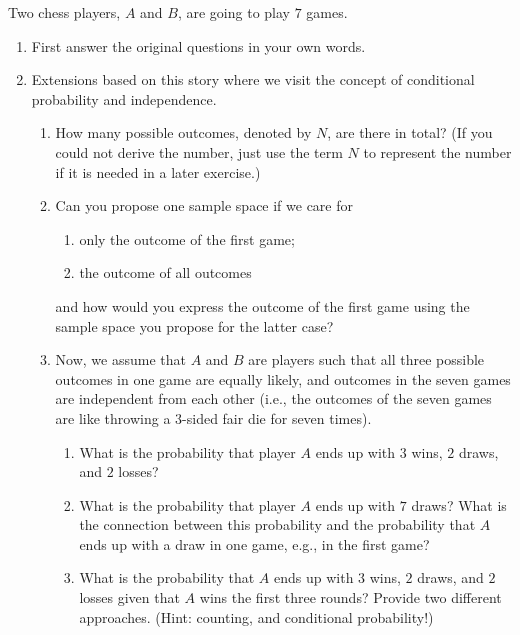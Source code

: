 
\begin{exercise}[\textbf{BH.7}]
	Two chess players, $A$ and $B$, are going to play $7$ games. 
		\begin{enumerate}
		\item First answer the original questions in your own words.
		\item Extensions based on this story where we visit the concept of conditional probability and independence.
		\begin{enumerate}
					\item How many possible outcomes, denoted by $N$, are there in total? (If you could not derive the number, just use the term $N$ to represent the number if it is needed in a later exercise.)
			\item Can you propose one sample space if we care for 
			\begin{enumerate}
				\item only the outcome of the first game;
				\item the outcome of all outcomes
			\end{enumerate}
			and how would you express the outcome of the first game using the sample space you propose for the latter case?
			\item Now, we assume that $A$ and $B$ are players such that all three possible outcomes in one game are equally likely, and outcomes in the seven games are independent from each other (i.e., the outcomes of the seven games are like throwing a $3$-sided fair die for seven times). 
			\begin{enumerate}
				\item What is the probability that player $A$ ends up with $3$ wins, $2$ draws, and $2$ losses?
				\item What is the probability that player $A$ ends up with $7$ draws? What is the connection between this probability and the probability that $A$ ends up with a draw in one game, e.g., in the first game?
				\item What is the probability that $A$ ends up with $3$ wins, $2$ draws, and $2$ losses given that $A$ wins the first three rounds? Provide two different approaches. (Hint: counting, and conditional probability!) 
			\end{enumerate}
		\end{enumerate}
		\end{enumerate}
\end{exercise}


